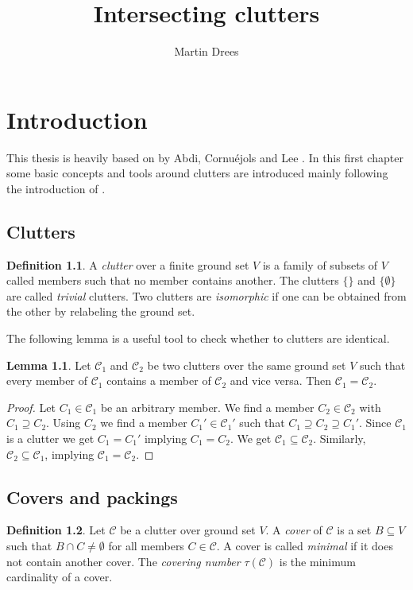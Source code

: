 \documentclass[a4paper, 12pt, twoside=false]{scrbook}
\title{Intersecting clutters}
\author{Martin Drees}
\theoremstyle{definition}
\newtheorem*{definition}{Definition}
\newtheorem{lemma}[theorem]{Lemma}
\begin{document}
   \maketitle
   \tableofcontents
   \chapter{Introduction}
   This thesis is heavily based on  by Abdi, Cornuéjols and Lee \cite{restrictions}.
   In this first chapter some basic concepts and tools around clutters are introduced mainly following the introduction of \cite{restrictions}.
   \section{Clutters}
   \begin{definition}
       A \emph{clutter} over a finite ground set $V$ is a family of subsets of $V$ called members such that no member contains another.
       The clutters $\{\}$ and $\{\emptyset\}$ are called \emph{trivial} clutters.
       Two clutters are \emph{isomorphic} if one can be obtained from the other by relabeling the ground set.
   \end{definition}
   The following lemma is a useful tool to check whether to clutters are identical.
   \begin{lemma}\label{equalclutters}
       Let $\mathcal{C}_1$ and $\mathcal{C}_2$ be two clutters over the same ground set $V$ such that every member of $\mathcal{C}_1$ contains a member of $\mathcal{C}_2$ and vice versa.
       Then $\mathcal{C}_1=\mathcal{C}_2$.
   \end{lemma}

   \begin{proof}
       Let $C_1 \in \mathcal{C}_1$ be an arbitrary member.
       We find a member $C_2 \in \mathcal{C}_2$ with $C_1 \supseteq C_2$.
       Using $C_2$ we find a member $C_1' \in \mathcal{C}_1'$ such that $C_1 \supseteq C_2 \supseteq C_1'$.
       Since $\mathcal{C}_1$ is a clutter we get $C_1=C_1'$ implying $C_1=C_2$.
       We get $\mathcal{C}_1 \subseteq \mathcal{C}_2$.
       Similarly, $\mathcal{C}_2 \subseteq \mathcal{C}_1$, implying $\mathcal{C}_1=\mathcal{C}_2$.
   \end{proof}

\section{Covers and packings}
\begin{definition}
    Let $\mathcal{C}$ be a clutter over ground set $V$.
    A \emph{cover} of $\mathcal{C}$ is a set $B \subseteq V$ such that $B \cap C \neq \emptyset$ for all members $C \in \mathcal{C}$.
    A cover is called \emph{minimal} if it does not contain another cover.
    The \emph{covering number} $\tau(\mathcal{C})$ is the minimum cardinality of a cover.
\end{definition}
\end{document}

